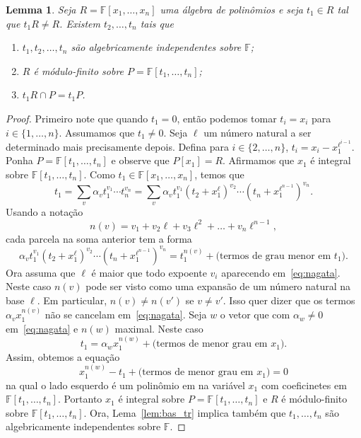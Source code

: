 \documentclass[12pt]{amsart}
\newcommand{\F}{\mathbb F}
\newtheorem{lemma}[theorem]{Lemma}
\begin{document}
\begin{lemma}\label{lemma1}
    Seja $R=\F[x_1,\ldots,x_n]$ uma álgebra de polinômios e seja $t_1\in R$ tal que $t_1R\neq R$. Existem $t_2,\ldots,t_n$ tais que 
    \begin{enumerate}
        \item $t_1,t_2,\ldots,t_n$ são algebricamente independentes sobre $\F$;
        \item $R$ é módulo-finito sobre $P=\F[t_1,\ldots,t_n]$;
        \item $t_1R\cap P = t_1P$.
    \end{enumerate} 
\end{lemma}
\begin{proof}
    Primeiro note que quando $t_1=0$, então podemos tomar $t_i=x_i$ para $i\in\{1,\ldots,n\}$. 
    Assumamos que $t_1\neq 0$. 
    Seja $\ell$ um número natural a ser determinado mais precisamente depois. 
    Defina para $i\in\{2,\ldots,n\}$, $t_i=x_i-x_1^{\ell^{i-1}}$. Ponha $P=\F[t_1,\ldots,t_n]$ e observe que 
    $P[x_1]=R$. Afirmamos que $x_1$ é integral sobre $\F[t_1,\ldots,t_n]$. Como 
    $t_1\in\F[x_1,\ldots,x_n]$, temos que   
\begin{equation}\label{eq:nagata}  
    t_1=\sum_v \alpha_vt_1^{v_1}\cdots t_n^{v_n}=
    \sum_v \alpha_v t_1^{v_1}(t_2+x_1^{\ell})^{v_2}\cdots(t_n+x_1^{\ell^{n-1}})^{v_n}.
\end{equation}
Usando a notação 
\begin{equation}\label{eq:n}
    n(v)=v_1+v_2\ell+v_3\ell^2+\ldots+v_n\ell^{n-1},
\end{equation}
cada parcela na soma anterior tem a forma
\[    
    \alpha_v t_1^{v_1}(t_2+x_1^{\ell})^{v_2}\cdots(t_n+x_1^{\ell^{n-1}})^{v_n}=
    t_1^{n(v)}+\mbox{(termos de grau menor em $t_1$).}
\] 
Ora assuma que $\ell$ é maior que todo expoente $v_i$ aparecendo em~\eqref{eq:nagata}. 
Neste caso $n(v)$ pode ser visto como uma expansão de um número natural na base $\ell$. Em particular, 
$n(v)\neq n(v')$ se $v\neq v'$. Isso quer dizer que os termos $\alpha_v x_1^{n(v)}$ não se cancelam 
em~\eqref{eq:nagata}. Seja $w$ o vetor que com $\alpha_w\neq 0$ em~\eqref{eq:nagata} e 
$n(w)$ maximal. Neste caso 
\[
    t_1=\alpha_wx_1^{n(w)}+\mbox{(termos de menor grau em $x_1$)}.
\]
Assim, obtemos a equação
\[
    x_1^{n(w)}-t_1+\mbox{(termos de menor grau em $x_1$)}=0
\]
na qual o lado esquerdo é um polinômio em na variável $x_1$ com coeficinetes em $\F[t_1,\ldots,t_n]$. 
Portanto $x_1$ é integral sobre $P=\F[t_1,\ldots,t_n]$ e $R$ é módulo-finito sobre $\F[t_1,\ldots,t_n]$.
Ora, Lema~\ref{lem:bas_tr} implica também que $t_1,\ldots,t_n$ são algebricamente independentes sobre $\F$. 


\end{proof}
\end{document}
